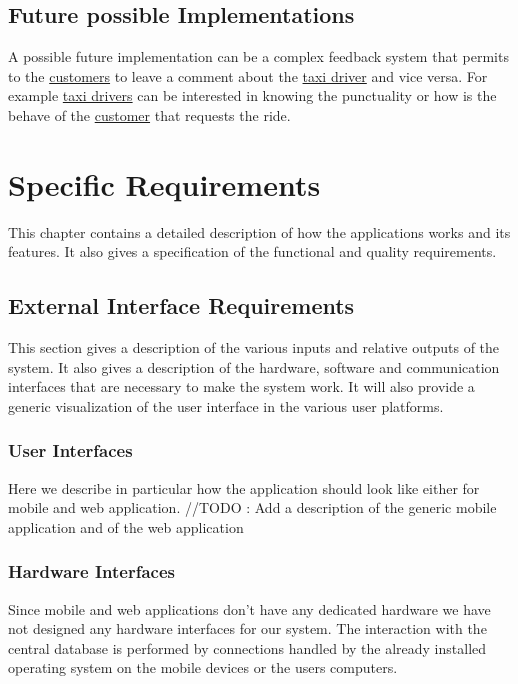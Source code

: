 \documentclass{report}
\begin{document}
	\section{Future possible Implementations}
	A possible future implementation can be a complex feedback system that permits to the \hyperref[sec:customer]{customers} to leave a comment about the \hyperref[sec:tdriver]{taxi driver} and vice versa.
	For example \hyperref[sec:tdriver]{taxi drivers} can be interested in knowing the punctuality or how is the behave of the \hyperref[sec:customer]{customer} that requests the ride.

\chapter{Specific Requirements}
This chapter contains a detailed description of how the applications works and its features. It also gives a specification of the functional and quality requirements.

	\section{External Interface Requirements}
	This section gives a description of the various inputs and relative outputs of the system. It also gives a description of the hardware, software and communication interfaces that are necessary to make the system work. It will also provide a generic visualization of the user interface in the various user platforms.

		\subsection{User Interfaces}
		Here we describe in particular how the application should look like either for mobile and web application.
		//TODO : Add a description of the generic mobile application and of the web application

		\subsection{Hardware Interfaces}
		Since mobile and web applications don't have any dedicated hardware we have not designed any hardware interfaces for our system.
		The interaction with the central database is performed by connections handled by the already installed operating system on the mobile devices or the users computers.
\end{document}
